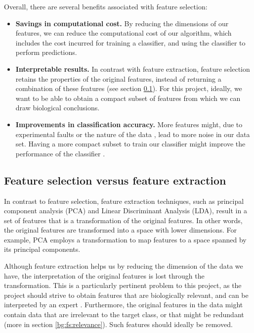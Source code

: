 \documentclass[12pt, twoside, a4paper]{report}
\begin{document}
Overall, there are several benefits associated with feature selection:
\begin{itemize}
  \item \textbf{Savings in computational cost.} By reducing the dimensions of our features, we can reduce the computational cost of our algorithm, which includes the cost incurred for training a classifier, and using the classifier to perform predictions.
  \item \textbf{Interpretable results.} In contrast with feature extraction, feature selection retains the properties of the original features, instead of returning a combination of these features (see section \ref{bg:fs:extraction}). For this project, ideally, we want to be able to obtain a compact subset of features from which we can draw biological conclusions.
  \item \textbf{Improvements in classification accuracy.} More features might, due to experimental faults or the nature of the data \cite{RefWorks:197}, lead to more noise in our data set. Having a more compact subset to train our classifier might improve the performance of the classifier \cite{RefWorks:174}.
\end{itemize}

\subsection{Feature selection versus feature extraction} \label{bg:fs:extraction}

In contrast to feature selection, feature extraction techniques, such as principal component analysis (PCA) and Linear Discriminant Analysis (LDA), result in a set of features that is a transformation of the original features. In other words, the original features are transformed into a space with lower dimensions. For example, PCA employs a transformation to map features to a space spanned by its principal components.

Although feature extraction helps us by reducing the dimension of the data we have, the interpretation of the original features is lost through the transformation. This is a particularly pertinent problem to this project, as the project should strive to obtain features that are biologically relevant, and can be interpreted by an expert \cite{RefWorks:192}. Furthermore, the original features in the data might contain data that are irrelevant to the target class, or that might be redundant (more in section \ref{bg:fs:relevance}). Such features should ideally be removed.
\end{document}
